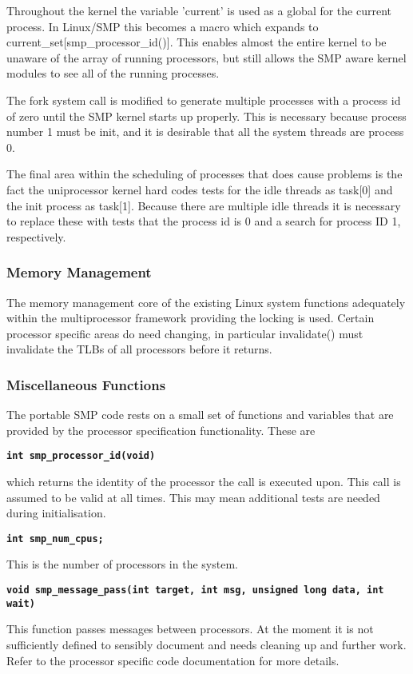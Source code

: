 \documentclass[]{article}
\begin{document}
Throughout the kernel the variable 'current' is used as a global for the 
current process. In Linux/SMP this becomes a macro which expands to 
current\_set[smp\_processor\_id()]. This enables almost the entire kernel to 
be unaware of the array of running processors, but still allows the SMP 
aware kernel modules to see all of the running processes.

The fork system call is modified to generate multiple processes with a 
process id of zero until the SMP kernel starts up properly. This is 
necessary because process number 1 must be init, and it is desirable that 
all the system threads are process 0. 

The final area within the scheduling of processes that does cause problems 
is the fact the uniprocessor kernel hard codes tests for the idle threads 
as task[0] and the init process as task[1]. Because there are multiple idle 
threads it is necessary to replace these with tests that the process id is 
0 and a search for process ID 1, respectively.

\subsubsection{Memory Management}
The memory management core of the existing Linux system functions 
adequately within the multiprocessor framework providing the locking is 
used. Certain processor specific areas do need changing, in particular 
invalidate() must invalidate the TLBs of all processors before it returns.


\subsubsection{Miscellaneous Functions}
The portable SMP code rests on a small set of functions and variables 
that are provided by the processor specification functionality. These are

{\tt \bf int smp\_processor\_id(void) }

which returns the identity of the processor the call is executed upon. This 
call is assumed to be valid at all times. This may mean additional tests 
are needed during initialisation.


{\tt \bf int smp\_num\_cpus;}

This is the number of processors in the system. \

{\tt \bf void smp\_message\_pass(int target, int msg, unsigned long data,
		int wait)}

This function passes messages between processors. At the moment it is not 
sufficiently defined to sensibly document and needs cleaning up and further 
work. Refer to the processor specific code documentation for more details.
\end{document}
